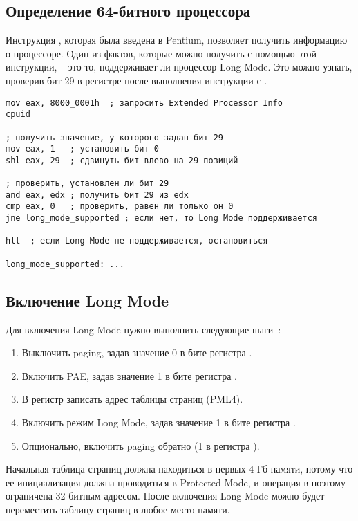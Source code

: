 \documentclass[a4page]{article}
\begin{document}
\subsection{Определение 64-битного процессора}

Инструкция , которая была введена в Pentium,
позволяет получить информацию о процессоре.
Один из фактов, которые можно получить с помощью этой инструкции,
-- это то, поддерживает ли процессор Long Mode.
Это можно узнать, проверив бит 29 в регистре  после выполнения
инструкции  с .

\begin{verbatim}
mov eax, 8000_0001h  ; запросить Extended Processor Info
cpuid

; получить значение, у которого задан бит 29
mov eax, 1   ; установить бит 0
shl eax, 29  ; сдвинуть бит влево на 29 позиций

; проверить, установлен ли бит 29
and eax, edx ; получить бит 29 из edx
cmp eax, 0   ; проверить, равен ли только он 0
jne long_mode_supported ; если нет, то Long Mode поддерживается

hlt  ; если Long Mode не поддерживается, остановиться

long_mode_supported: ...
\end{verbatim}

\subsection{Включение Long Mode}

Для включения Long Mode нужно выполнить следующие шаги~\cite{web:intel-ia32}:

\begin{enumerate}
    \item Выключить paging, задав значение 0 в бите  регистра .
    \item Включить PAE, задав значение 1 в бите  регистра .
    \item В регистр  записать адрес таблицы страниц (PML4).
    \item Включить режим Long Mode, задав значение 1 в бите  регистра .
    \item Опционально, включить paging обратно (1 в  регистра ).
\end{enumerate}

Начальная таблица страниц должна находиться в первых 4 Гб памяти, потому что
ее инициализация должна проводиться в Protected Mode, и операция  в 
поэтому ограничена 32-битным адресом.
После включения Long Mode можно будет переместить таблицу страниц в любое место памяти.
\end{document}
